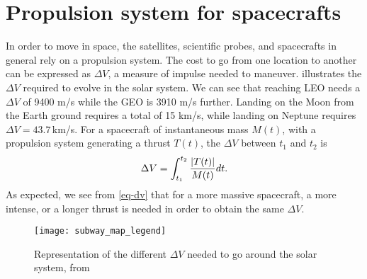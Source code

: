 


\section{Propulsion system for spacecrafts}
\label{sec-propulsion}


In order to move in space, the satellites, scientific probes, and spacecrafts in general rely on a propulsion system.
The cost to go from one location to another can be expressed as $\Delta V$, a measure of impulse needed to maneuver.
 illustrates the $\Delta V$ required to evolve in the solar system.
We can see that reaching \ac{LEO} needs a $\Delta V$ of 9400 m/s while the \ac{GEO} is 3910 m/s further.
Landing on the Moon from the Earth ground requires a total of 15 km/s, while landing on Neptune requires $\Delta V =43.7$\,km/s.
For a spacecraft of instantaneous mass $M(t)$, with a propulsion system generating a thrust $T(t)$, the $\Delta V$ between $t_1$ and $t_2$ is
\begin{equation} \label{eq-dv}
  \Delta V = \int_{t_1}^{t_2} \frac{ \lvert T(t)\rvert}{M(t)} dt.
\end{equation}
As expected, we see from \cref{eq-dv} that for a more massive spacecraft, a more intense, or a longer thrust is needed in order to obtain the same $\Delta V$.
\begin{figure}[!hbt]
  \centering
  \texttt{[image: subway\_map\_legend]}
  \caption{Representation of the different $\Delta V$ needed to go around the solar system, from \citet{reddit-subway}}
  \label{fig-subway_DV}
\end{figure}

